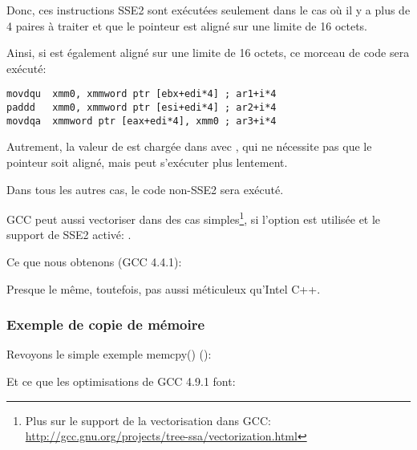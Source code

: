 Donc, ces instructions SSE2 sont exécutées seulement dans le cas où il y a plus
de 4 paires à traiter et que le pointeur  est aligné sur une limite de 16
octets.

Ainsi, si  est également aligné sur une limite de 16 octets, ce morceau de
code sera exécuté:

\begin{lstlisting}[style=customasmx86]
movdqu  xmm0, xmmword ptr [ebx+edi*4] ; ar1+i*4
paddd   xmm0, xmmword ptr [esi+edi*4] ; ar2+i*4
movdqa  xmmword ptr [eax+edi*4], xmm0 ; ar3+i*4
\end{lstlisting}

Autrement, la valeur de  est chargée dans  avec \MOVDQU, qui ne nécessite
pas que le pointeur soit aligné, mais peut s'exécuter plus lentement.



Dans tous les autres cas, le code non-SSE2 sera exécuté.


\newcommand{\URLGCCVEC}{\url{http://gcc.gnu.org/projects/tree-ssa/vectorization.html}}

GCC peut aussi vectoriser dans des cas simples\footnote{Plus sur le support de la
vectorisation dans GCC: \URLGCCVEC}, si l'option \Othree est utilisée et le support
de SSE2 activé: .

Ce que nous obtenons (GCC 4.4.1):



Presque le même, toutefois, pas aussi méticuleux qu'Intel C++.

\subsubsection{Exemple de copie de mémoire}
\label{vec_memcpy}

Revoyons le simple exemple memcpy()
():



Et ce que les optimisations de GCC 4.9.1 font:


